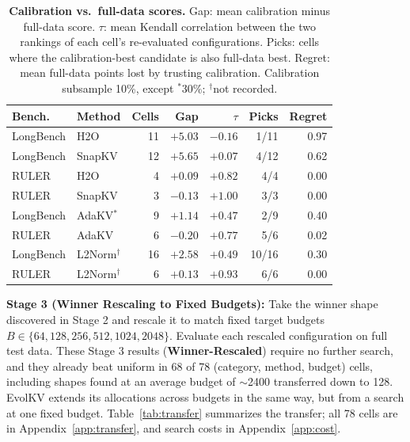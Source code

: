 \documentclass[11pt]{article}
\begin{document}
\begin{table}[htbp]
  \centering
  \footnotesize
  \setlength{\tabcolsep}{2.5pt}
  \begin{tabular}{@{} l l r r r r r @{}}
    \toprule
    \textbf{Bench.} & \textbf{Method} & \textbf{Cells} & \textbf{Gap} & \textbf{$\tau$} & \textbf{Picks} & \textbf{Regret} \\
    \midrule
    \rowcolor{gray!10}
    LongBench & H2O    & 11 & $+5.03$ & $-0.16$ & 1/11 & 0.97 \\
    LongBench & SnapKV & 12 & $+5.65$ & $+0.07$ & 4/12 & 0.62 \\
    \rowcolor{gray!10}
    RULER     & H2O    & 4  & $+0.09$ & $+0.82$ & 4/4  & 0.00 \\
    RULER     & SnapKV & 3  & $-0.13$ & $+1.00$ & 3/3  & 0.00 \\
    \midrule
    \rowcolor{gray!10}
    LongBench & AdaKV$^\ast$ & 9 & $+1.14$ & $+0.47$ & 2/9 & 0.40 \\
    RULER     & AdaKV  & 6  & $-0.20$ & $+0.77$ & 5/6  & 0.02 \\
    \midrule
    \rowcolor{gray!10}
    LongBench & L2Norm$^\dagger$ & 16 & $+2.58$ & $+0.49$ & 10/16 & 0.30 \\
    RULER     & L2Norm$^\dagger$ & 6  & $+0.13$ & $+0.93$ & 6/6   & 0.00 \\
    \bottomrule
  \end{tabular}
  \caption{\textbf{Calibration vs.\ full-data scores.} Gap: mean calibration minus full-data score. $\tau$: mean Kendall correlation between the two rankings of each cell's re-evaluated configurations. Picks: cells where the calibration-best candidate is also full-data best. Regret: mean full-data points lost by trusting calibration. Calibration subsample 10\%, except $^\ast$30\%; $^\dagger$not recorded.}
  \label{tab:calib}
\end{table}

\textbf{Stage 3 (Winner Rescaling to Fixed Budgets):} Take the winner shape discovered in Stage 2 and rescale it to match fixed target budgets $B \in \{64, 128, 256, 512, 1024, 2048\}$. Evaluate each rescaled configuration on full test data. These Stage 3 results (\textbf{Winner-Rescaled}) require no further search, and they already beat uniform in 68 of 78 (category, method, budget) cells, including shapes found at an average budget of $\sim$2400 transferred down to 128. EvolKV extends its allocations across budgets in the same way, but from a search at one fixed budget. Table~\ref{tab:transfer} summarizes the transfer; all 78 cells are in Appendix~\ref{app:transfer}, and search costs in Appendix~\ref{app:cost}.
\end{document}
